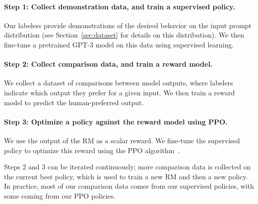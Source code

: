 \documentclass{article}
\begin{document}
\paragraph{Step 1: Collect demonstration data, and train a supervised policy.} Our labelers provide demonstrations of the desired behavior on the input prompt distribution (see Section~\ref{sec:dataset} for details on this distribution). We then fine-tune a pretrained GPT-3 model on this data using supervised learning.

\paragraph{Step 2: Collect comparison data, and train a reward model.} We collect a dataset of comparisons between model outputs, where labelers indicate which output they prefer for a given input. We then train a reward model to predict the human-preferred output.

\paragraph{Step 3: Optimize a policy against the reward model using PPO.} We use the output of the RM as a scalar reward. We fine-tune the supervised policy to optimize this reward using the PPO algorithm~\citep{schulman2017proximal}.

Steps 2 and 3 can be iterated continuously; more comparison data is collected on the current best policy, which is used to train a new RM and then a new policy. In practice, most of our comparison data comes from our supervised policies, with some coming from our PPO policies.
\end{document}
